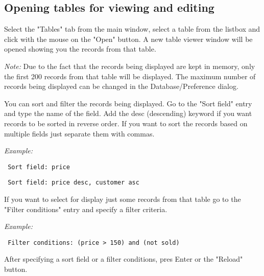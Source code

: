 \subsection{Opening tables for viewing and editing}
Select the "Tables" tab from the main window, select a table from the listbox and click with the mouse on the "Open" button. A new table viewer window will be opened showing you the records from that table.

\textit{Note:} Due to the fact that the records being displayed are kept in memory, only the first 200 records from that table will be displayed. The maximum number of records being displayed can be changed in the Database/Preference dialog.

You can sort and filter the records being displayed. Go to the "Sort field" entry and type the name of the field. Add the desc (descending) keyword if you want records to be sorted in reverse order. If you want to sort the records based on multiple fields just separate them with commas.

\textit{Example:}

\texttt{	Sort field: price}

\texttt{	Sort field: price desc, customer asc}

If you want to select for display just some records from that table go to the "Filter conditions" entry and specify a filter criteria.

\textit{Example:}

\texttt{	Filter conditions: (price > 150) and (not sold)}

After specifying a sort field or a filter conditions, pres Enter or the "Reload" button.
